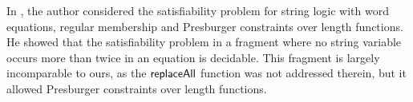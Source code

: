 

%


In \cite{L16}, the author considered the satisfiability problem for string logic with word equations, regular membership and Presburger constraints over length functions. %
He showed that the satisfiability problem in a fragment where no string variable occurs more than twice in an equation is decidable. 
This fragment is largely incomparable to ours, as the $\mathsf{replaceAll}$ function was not addressed therein, but it allowed Presburger constraints over length functions.

